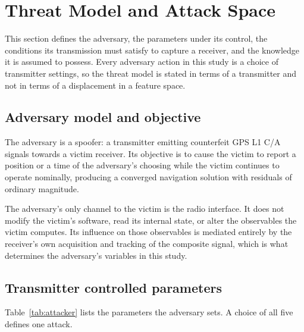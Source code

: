 \section{Threat Model and Attack Space}
\label{sec:threat}

This section defines the adversary, the parameters under its control, the conditions its
transmission must satisfy to capture a receiver, and the knowledge it is assumed to
possess. Every adversary action in this study is a choice of transmitter settings, so the
threat model is stated in terms of a transmitter and not in terms of a displacement in
a feature space.

\subsection{Adversary model and objective}

The adversary is a spoofer: a transmitter emitting counterfeit GPS L1 C/A signals towards
a victim receiver. Its objective is to cause the victim to report a position or a time of
the adversary's choosing while the victim continues to operate nominally, producing a
converged navigation solution with residuals of ordinary magnitude.

The adversary's only channel to the victim is the radio interface. It does not modify the
victim's software, read its internal state, or alter the observables the victim computes.
Its influence on those observables is mediated entirely by the receiver's own acquisition
and tracking of the composite signal, which is what determines the adversary's variables
in this study.

\subsection{Transmitter controlled parameters}

Table~\ref{tab:attacker} lists the parameters the adversary sets. A choice of all five
defines one attack.

